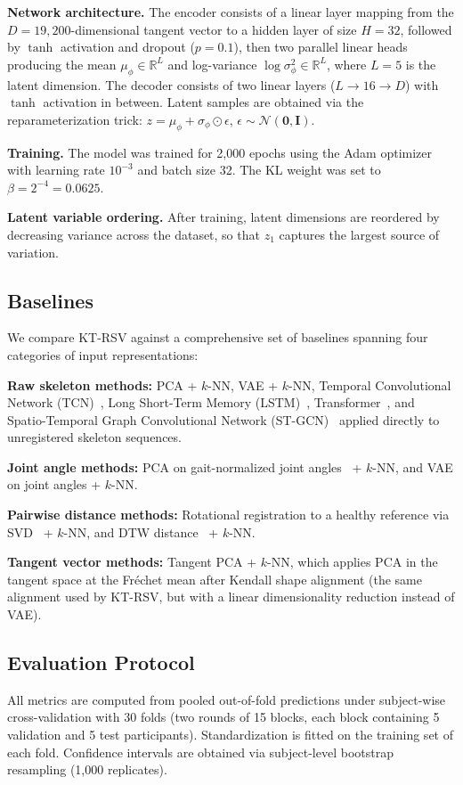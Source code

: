 \documentclass{article}
\begin{document}
\textbf{Network architecture.} The encoder consists of a linear layer mapping from the $D = 19{,}200$-dimensional tangent vector to a hidden layer of size $H = 32$, followed by $\tanh$ activation and dropout ($p = 0.1$), then two parallel linear heads producing the mean $\mu_\phi \in \mathbb{R}^L$ and log-variance $\log \sigma^2_\phi \in \mathbb{R}^L$, where $L = 5$ is the latent dimension. The decoder consists of two linear layers ($L \to 16 \to D$) with $\tanh$ activation in between. Latent samples are obtained via the reparameterization trick: $z = \mu_\phi + \sigma_\phi \odot \epsilon$, $\epsilon \sim \mathcal{N}(\mathbf{0}, \mathbf{I})$.

\textbf{Training.} The model was trained for 2{,}000 epochs using the Adam optimizer with learning rate $10^{-3}$ and batch size 32. The KL weight was set to $\beta = 2^{-4} = 0.0625$.

\textbf{Latent variable ordering.} After training, latent dimensions are reordered by decreasing variance across the dataset, so that $z_1$ captures the largest source of variation.

\subsection{Baselines}
We compare KT-RSV against a comprehensive set of baselines spanning four categories of input representations:

\textbf{Raw skeleton methods:} PCA + $k$-NN, VAE + $k$-NN, Temporal Convolutional Network (TCN)~\cite{lea2017temporal}, Long Short-Term Memory (LSTM)~\cite{hochreiter1997long}, Transformer~\cite{vaswani2017attention}, and Spatio-Temporal Graph Convolutional Network (ST-GCN)~\cite{yan2018spatial} applied directly to unregistered skeleton sequences.

\textbf{Joint angle methods:} PCA on gait-normalized joint angles~\cite{cho2024stroke} + $k$-NN, and VAE on joint angles + $k$-NN.

\textbf{Pairwise distance methods:} Rotational registration to a healthy reference via SVD~\cite{eichler20183d} + $k$-NN, and DTW distance~\cite{tormene2009matching} + $k$-NN.

\textbf{Tangent vector methods:} Tangent PCA + $k$-NN, which applies PCA in the tangent space at the Fr\'{e}chet mean after Kendall shape alignment (the same alignment used by KT-RSV, but with a linear dimensionality reduction instead of VAE).

\subsection{Evaluation Protocol}
All metrics are computed from pooled out-of-fold predictions under subject-wise cross-validation with 30 folds (two rounds of 15 blocks, each block containing 5 validation and 5 test participants). Standardization is fitted on the training set of each fold. Confidence intervals are obtained via subject-level bootstrap resampling (1{,}000 replicates).
\end{document}

